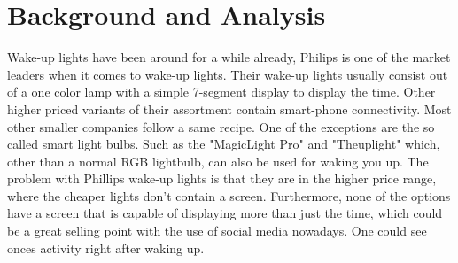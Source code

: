 \chapter{Background and Analysis}
Wake-up lights have been around for a while already, Philips \cite{other:philips} is one of the market leaders when it comes to wake-up lights. Their wake-up lights usually consist out of a one color lamp with a simple 7-segment display to display the time. Other higher priced variants of their assortment contain smart-phone connectivity. Most other smaller companies follow a same recipe. One of the exceptions are the so called smart light bulbs. Such as the "MagicLight Pro" \cite{other:magiclight} and "Theuplight" \cite{other:theuplight} which, other than a normal RGB lightbulb, can also be used for waking you up. The problem with Phillips wake-up lights is that they are in the higher price range, where the cheaper lights don't contain a screen. Furthermore, none of the options have a screen that is capable of displaying more than just the time, which could be a great selling point with the use of social media nowadays. One could see onces activity right after waking up.